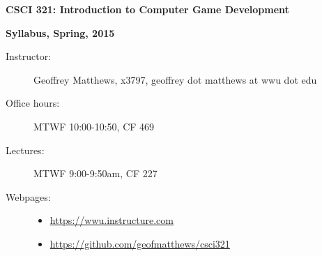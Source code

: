 \documentclass{article}
\begin{document}
\centerline{\Large \bf CSCI 321: Introduction to Computer Game Development}

\centerline{\bf Syllabus,  Spring, 2015}

\begin{description}

\item[Instructor:] Geoffrey Matthews, x3797,
 geoffrey dot matthews at wwu dot edu

\item[Office hours:] MTWF 10:00-10:50, CF 469

\item[Lectures:] MTWF 9:00-9:50am, CF 227


\item [Webpages:] \mbox{}\begin{itemize}
\item\url{https://wwu.instructure.com} 
\item\url{https://github.com/geofmatthews/csci321}
\end{itemize}




\end{description}
\end{document}
